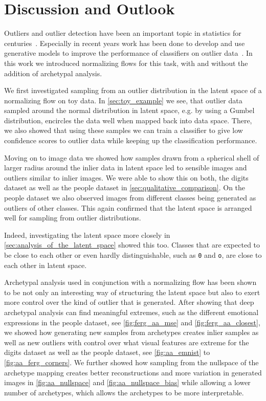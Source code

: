 \chapter{Discussion and Outlook}%
\label{cha:discussion}

Outliers and outlier detection have been an important topic in statistics for
centuries~\citep{zimekThereBackAgain2018}. Especially in recent years work has
been done to develop and use generative models to improve the performance of
classifiers on outlier
data~\citep{meinkeNeuralNetworksThat2019,schottFirstAdversariallyRobust2018,leeTrainingConfidencecalibratedClassifiers2018}.
In this work we introduced normalizing flows for this task, with and without
the addition of archetypal analysis.

We first investigated sampling from an outlier distribution in the latent space
of a normalizing flow on toy data. In \autoref{sec:toy_example} we see, that
outlier data sampled around the normal distribution in latent space, e.g. by
using a Gumbel distribution, encircles the data well when mapped back into data
space. There, we also showed that using these samples we can train a classifier
to give low confidence scores to outlier data while keeping up the
classification performance.

Moving on to image data we showed how samples drawn from a spherical shell of
larger radius around the inlier data in latent space led to sensible images and
outliers similar to inlier images. We were able to show this on both, the
digits dataset as well as the people dataset in
\autoref{sec:qualitative_comparison}. On the people dataset we also
observed images from different classes being generated as outliers of other
classes. This again confirmed that the latent space is arranged well for
sampling from outlier distributions.

Indeed, investigating the latent space more closely in
\autoref{sec:analysis_of_the_latent_space} showed this too. Classes that are
expected to be close to each other or even hardly distinguishable, such as
\texttt{0} and \texttt{o}, are close to each other in latent space.

Archetypal analysis used in conjunction with a normalizing flow has been shown
to be not only an interesting way of structuring the latent space but also to
exert more control over the kind of outlier that is generated. After showing
that deep archetypal analysis can find meaningful extremes, such as the
different emotional expressions in the people dataset, see
\autoref{fig:ferg_aa_mse} and \autoref{fig:ferg_aa_closest}, we showed how
generating new samples from archetypes creates inlier samples as well as new
outliers with control over what visual features are extreme for the digits
dataset as well as the people dataset, see \autoref{fig:aa_emnist} to
\autoref{fig:aa_ferg_corners}. We further showed how sampling from the
nullspace of the archetype mapping creates better reconstructions and more
variation in generated images in \autoref{fig:aa_nullspace} and
\autoref{fig:aa_nullspace_bias} while allowing a lower number of archetypes,
which allows the archetypes to be more interpretable.

